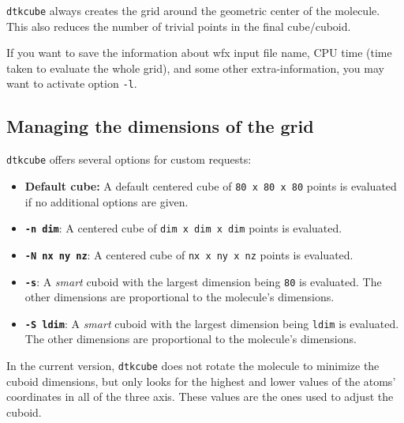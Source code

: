 \texttt{dtkcube} always creates the grid around the geometric center of the molecule. This also reduces the number of trivial points in the final cube/cuboid.

If you want to save the information about wfx input file name, CPU time (time taken to evaluate the whole grid), and some other extra-information, you may want to activate option \texttt{-l}.

\subsection{Managing the dimensions of the grid}

\texttt{dtkcube} offers several options for custom requests:
\begin{itemize}
   \item \textbf{Default cube: } A default centered cube of \texttt{80 x 80 x 80} points is evaluated if no additional options are given.
  	\item\texttt{\textbf{-n dim}}: A centered cube of \texttt{dim x dim x dim} points is evaluated.
	\item\texttt{\textbf{-N nx ny nz}}: A centered cube of \texttt{nx x ny x nz} points is evaluated.
	\item\texttt{\textbf{-s}}: A \textit{smart} cuboid with the largest dimension being \texttt{80} is evaluated. The other dimensions are proportional to the molecule's dimensions.
	\item\texttt{\textbf{-S ldim}}: A \textit{smart} cuboid with the largest dimension being \texttt{ldim} is evaluated. The other dimensions are proportional to the molecule's dimensions.
\end{itemize}

In the current version, \texttt{dtkcube} does not rotate the molecule to minimize the cuboid dimensions, but only looks for the highest and lower values of the atoms' coordinates in all of the three axis. These values are the ones used to adjust the cuboid.

